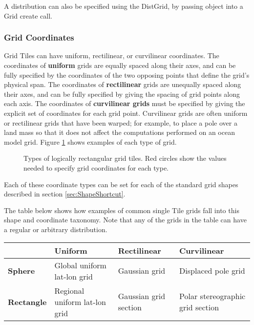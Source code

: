 A distribution can also be specified using the DistGrid, by passing
object into a Grid create call.

\subsubsection{Grid Coordinates}
\label{sec:coordspec}
Grid Tiles can have uniform, rectilinear, or curvilinear
coordinates.  The coordinates of {\bf uniform} grids are equally spaced along
their axes, and can be fully specified by the coordinates of the two opposing points
that define the grid's physical span.  The coordinates of {\bf rectilinear} grids
are unequally spaced along their axes, and can be fully specified by giving
the spacing of grid points along each axis.  The coordinates of {\bf curvilinear 
grids} must be specified by giving the explicit set of coordinates for each
grid point.  Curvilinear grids are often uniform or rectilinear grids that 
have been warped; for example, to place a pole over a land mass so that it
does not affect the computations performed on an ocean model grid.  Figure
\ref{fig:LogRectGrids} shows examples of each type of grid.

 
\begin{figure}
\caption{Types of logically rectangular grid tiles.  Red circles show the
values needed to specify grid coordinates for each type.}
\label{fig:LogRectGrids}
\end{figure}

Each of these coordinate types can be set for each of the standard grid shapes
described in section \ref{sec:ShapeShortcut}.  

The table below shows how examples of common single Tile grids fall 
into this shape and coordinate taxonomy.  Note that any
of the grids in the table can have a regular or arbitrary distribution.

\medskip
\begin{tabular}{|p{.8in}|p{1.6in}|p{1.6in}|p{1.6in}|}
\hline
 & {\bf Uniform} & {\bf Rectilinear} & {\bf Curvilinear} \\ 
\hline
{\bf Sphere} & Global uniform lat-lon grid & Gaussian grid & Displaced pole grid \\
\hline
{\bf Rectangle} & Regional uniform lat-lon grid & Gaussian grid section & Polar stereographic grid section\\
\hline
\end{tabular}

